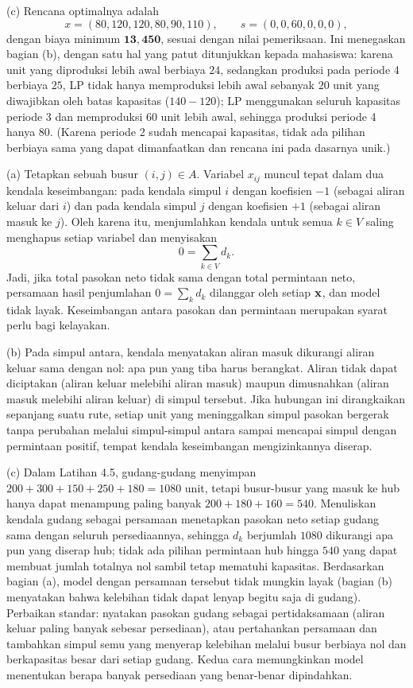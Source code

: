 (c) Rencana optimalnya adalah
\[
x = (80, 120, 120, 80, 90, 110), \qquad s = (0, 0, 60, 0, 0, 0),
\]
dengan biaya minimum $\mathbf{13{,}450}$, sesuai dengan nilai pemeriksaan. Ini menegaskan bagian (b), dengan satu hal yang patut ditunjukkan kepada mahasiswa: karena unit yang diproduksi lebih awal berbiaya $24$, sedangkan produksi pada periode 4 berbiaya $25$, LP tidak hanya memproduksi lebih awal sebanyak $20$ unit yang diwajibkan oleh batas kapasitas ($140 - 120$); LP menggunakan seluruh kapasitas periode 3 dan memproduksi $60$ unit lebih awal, sehingga produksi periode 4 hanya $80$. (Karena periode 2 sudah mencapai kapasitas, tidak ada pilihan berbiaya sama yang dapat dimanfaatkan dan rencana ini pada dasarnya unik.)


(a) Tetapkan sebuah busur $(i,j) \in A$. Variabel $x_{ij}$ muncul tepat dalam dua kendala keseimbangan: pada kendala simpul $i$ dengan koefisien $-1$ (sebagai aliran keluar dari $i$) dan pada kendala simpul $j$ dengan koefisien $+1$ (sebagai aliran masuk ke $j$). Oleh karena itu, menjumlahkan kendala untuk semua $k \in V$ saling menghapus setiap variabel dan menyisakan
\[
0 = \sum_{k \in V} d_k.
\]
Jadi, jika total pasokan neto tidak sama dengan total permintaan neto, persamaan hasil penjumlahan $0 = \sum_k d_k$ dilanggar oleh setiap $\mathbf{x}$, dan model tidak layak. Keseimbangan antara pasokan dan permintaan merupakan syarat perlu bagi kelayakan.

(b) Pada simpul antara, kendala menyatakan aliran masuk dikurangi aliran keluar sama dengan nol: apa pun yang tiba harus berangkat. Aliran tidak dapat diciptakan (aliran keluar melebihi aliran masuk) maupun dimusnahkan (aliran masuk melebihi aliran keluar) di simpul tersebut. Jika hubungan ini dirangkaikan sepanjang suatu rute, setiap unit yang meninggalkan simpul pasokan bergerak tanpa perubahan melalui simpul-simpul antara sampai mencapai simpul dengan permintaan positif, tempat kendala keseimbangan mengizinkannya diserap.

(c) Dalam Latihan 4.5, gudang-gudang menyimpan $200 + 300 + 150 + 250 + 180 = 1080$ unit, tetapi busur-busur yang masuk ke hub hanya dapat menampung paling banyak $200 + 180 + 160 = 540$. Menuliskan kendala gudang sebagai persamaan menetapkan pasokan neto setiap gudang sama dengan seluruh persediaannya, sehingga $d_k$ berjumlah $1080$ dikurangi apa pun yang diserap hub; tidak ada pilihan permintaan hub hingga $540$ yang dapat membuat jumlah totalnya nol sambil tetap mematuhi kapasitas. Berdasarkan bagian (a), model dengan persamaan tersebut tidak mungkin layak (bagian (b) menyatakan bahwa kelebihan tidak dapat lenyap begitu saja di gudang). Perbaikan standar: nyatakan pasokan gudang sebagai pertidaksamaan (aliran keluar paling banyak sebesar persediaan), atau pertahankan persamaan dan tambahkan simpul semu yang menyerap kelebihan melalui busur berbiaya nol dan berkapasitas besar dari setiap gudang. Kedua cara memungkinkan model menentukan berapa banyak persediaan yang benar-benar dipindahkan.

